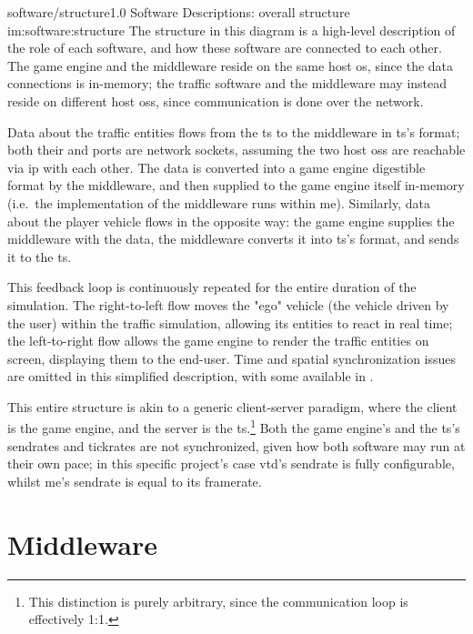 \begin{image}
	{software/structure}{1.0}
	{Software Descriptions: overall structure}
	{im:software:structure}
	{}
	{The structure in this diagram is a high-level description of the role of each software, and how these software are connected to each other. The game engine and the \gls{middleware} reside on the same host \gls{os}, since the data connections is in-memory; the traffic software and the \gls{middleware} may instead reside on different host \glspl{os}, since communication is done over the network.}
\end{image}

Data about the traffic entities flows from the \gls{ts} to the \gls{middleware} in \gls{ts}'s format; both their  and  ports are network sockets, assuming the two host \glspl{os} are reachable via \gls{ip} with each other. The data is converted into a game engine digestible format by the \gls{middleware}, and then supplied to the game engine itself in-memory (i.e.\ the implementation of the \gls{middleware} runs within \gls{me}). Similarly, data about the player vehicle flows in the opposite way: the game engine supplies the \gls{middleware} with the data, the \gls{middleware} converts it into \gls{ts}'s format, and sends it to the \gls{ts}.

This feedback loop is continuously repeated for the entire duration of the simulation. The right-to-left flow moves the "ego" vehicle (the vehicle driven by the user) within the traffic simulation, allowing its entities to react in real time; the left-to-right flow allows the game engine to render the traffic entities on screen, displaying them to the end-user. Time and spatial synchronization issues are omitted in this simplified description, with some available in .

This entire structure is akin to a generic client-server paradigm, where the client is the game engine, and the server is the \gls{ts}.\footnote{This distinction is purely arbitrary, since the communication loop is effectively \num{1}:\num{1}.} Both the game engine's and the \gls{ts}'s \glspl{sendrate} and \glspl{tickrate} are not synchronized, given how both software may run at their own pace; in this specific project's case \gls{vtd}'s \gls{sendrate} is fully configurable, whilst \gls{me}'s \gls{sendrate} is equal to its framerate.

\section{Middleware}\label{sc:software:middleware}

